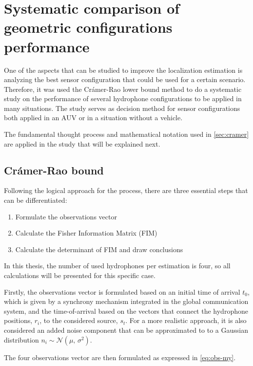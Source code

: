 \section{Systematic comparison of geometric configurations performance} \label{sec:analysis_config_performance}

One of the aspects that can be studied to improve the localization estimation is analyzing the best sensor configuration that could be used for a certain scenario. Therefore, it was used the Crámer-Rao lower bound method to do a systematic study on the performance of several hydrophone configurations to be applied in many situations. The study serves as decision method for sensor configurations both applied in an AUV or in a situation without a vehicle. 

The fundamental thought process and mathematical notation used in \ref{sec:cramer} are applied in the study that will be explained next.

\subsection{Crámer-Rao bound}  

Following the logical approach for the process, there are three essential steps that can be differentiated:

\begin{enumerate}
	
	\item Formulate the observations vector
	\item Calculate the Fisher Information Matrix (FIM)
	\item Calculate the determinant of FIM and draw conclusions
	
\end{enumerate}

In this thesis, the number of used hydrophones per estimation is four, so all calculations will be presented for this specific case.

Firstly, the observations vector is formulated based on an initial time of arrival $t_0$, which is given by a synchrony mechanism integrated in the global communication system, and the time-of-arrival based on the vectors that connect the hydrophone positions, $r_i$, to the considered source, $s_t$. For a more realistic approach, it is also considered an added noise component that can be approximated to to a Gaussian distribution $n_i \sim \mathcal{N}(\mu,\,\sigma^{2})$. 

The four observations vector are then formulated as expressed in \ref{eq:obs-my}.

